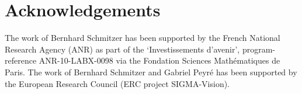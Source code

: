 



\section*{Acknowledgements}
The work of Bernhard Schmitzer has been supported by the French National Research Agency (ANR) as part of the `Investissements d'avenir', program-reference ANR-10-LABX-0098 via the Fondation Sciences Math\'ematiques de Paris.
%
The work of Bernhard Schmitzer and Gabriel Peyr\'e has been supported by the European Research Council (ERC project SIGMA-Vision). 


